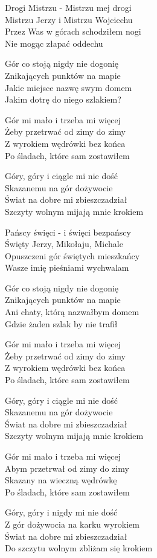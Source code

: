 \begin{text}
    Drogi Mistrzu - Mistrzu mej drogi\\
    Mistrzu Jerzy i Mistrzu Wojciechu\\
    Przez Was w górach schodziłem nogi\\
    Nie mogąc złapać oddechu

    Gór co stoją nigdy nie dogonię\\
    Znikających punktów na mapie\\
    Jakie miejsce nazwę swym domem\\
    Jakim dotrę do niego szlakiem?

    \hfill\break
    \vin Gór mi mało i trzeba mi więcej\\
    \vin Żeby przetrwać od zimy do zimy\\
    \vin Z wyrokiem wędrówki bez końca\\
    \vin Po śladach, które sam zostawiłem

    \vin Góry, góry i ciągle mi nie dość\\
    \vin Skazanemu na gór dożywocie\\
    \vin Świat na dobre mi zbieszczadział\\
    \vin Szczyty wolnym mijają mnie krokiem

    Pańscy święci - i święci bezpańscy\\
    Święty Jerzy, Mikołaju, Michale\\
    Opuszczeni gór świętych mieszkańcy\\
    Wasze imię pieśniami wychwalam

    Gór co stoją nigdy nie dogonię\\
    Znikających punktów na mapie\\
    Ani chaty, którą nazwałbym domem\\
    Gdzie żaden szlak by nie trafił

    \vin Gór mi mało i trzeba mi więcej\\
    \vin Żeby przetrwać od zimy do zimy\\
    \vin Z wyrokiem wędrówki bez końca\\
    \vin Po śladach, które sam zostawiłem

    \vin Góry, góry i ciągle mi nie dość\\
    \vin Skazanemu na gór dożywocie\\
    \vin Świat na dobre mi zbieszczadział\\
    \vin Szczyty wolnym mijają mnie krokiem

    \vin Gór mi mało i trzeba mi więcej\\
    \vin Abym przetrwał od zimy do zimy\\
    \vin Skazany na wieczną wędrówkę\\
    \vin Po śladach, które sam zostawiłem

    \vin Góry, góry i nigdy mi nie dość\\
    \vin Z gór dożywocia na karku wyrokiem\\
    \vin Świat na dobre mi zbieszczadział\\
    \vin Do szczytu wolnym zbliżam się krokiem
\end{text}
